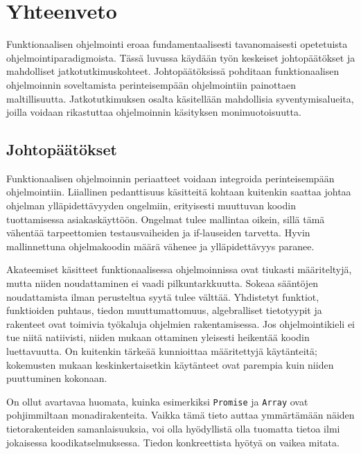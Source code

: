 \vspace{21.5pt}
\chapter{Yhteenveto}

Funktionaalisen ohjelmointi eroaa fundamentaalisesti tavanomaisesti opetetuista ohjelmointiparadigmoista. Tässä luvussa käydään työn keskeiset johtopäätökset ja mahdolliset jatkotutkimuskohteet. Johtopäätöksissä pohditaan funktionaalisen ohjelmoinnin soveltamista perinteisempään ohjelmointiin painottaen maltillisuutta. Jatkotutkimuksen osalta käsitellään mahdollisia syventymisalueita, joilla voidaan rikastuttaa ohjelmoinnin käsityksen monimuotoisuutta.

\section{Johtopäätökset}

Funktionaalisen ohjelmoinnin periaatteet voidaan integroida perinteisempään ohjelmointiin. Liiallinen pedanttisuus käsitteitä kohtaan kuitenkin saattaa johtaa ohjelman ylläpidettävyyden ongelmiin, erityisesti muuttuvan koodin tuottamisessa asiakaskäyttöön. Ongelmat tulee mallintaa oikein, sillä tämä vähentää tarpeettomien testausvaiheiden ja if-lauseiden tarvetta. Hyvin mallinnettuna ohjelmakoodin määrä vähenee ja ylläpidettävyys paranee.

Akateemiset käsitteet funktionaalisessa ohjelmoinnissa ovat tiukasti määriteltyjä, mutta niiden noudattaminen ei vaadi pilkuntarkkuutta. Sokeaa sääntöjen noudattamista ilman perusteltua syytä tulee välttää. Yhdistetyt funktiot, funktioiden puhtaus, tiedon muuttumattomuus, algebralliset tietotyypit ja rakenteet ovat toimivia työkaluja ohjelmien rakentamisessa. Jos ohjelmointikieli ei tue niitä natiivisti, niiden mukaan ottaminen yleisesti heikentää koodin luettavuutta. On kuitenkin tärkeää kunnioittaa määritettyjä käytänteitä; kokemusten mukaan keskinkertaisetkin käytänteet ovat parempia kuin niiden puuttuminen kokonaan.

On ollut avartavaa huomata, kuinka esimerkiksi \texttt{Promise} ja \texttt{Array} ovat pohjimmiltaan monadirakenteita. Vaikka tämä tieto auttaa ymmärtämään näiden tietorakenteiden samanlaisuuksia, voi olla hyödyllistä olla tuomatta tietoa ilmi jokaisessa koodikatselmuksessa. Tiedon konkreettista hyötyä on vaikea mitata.

